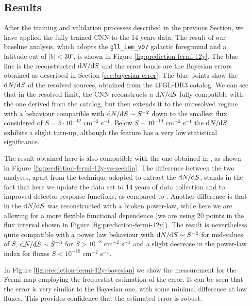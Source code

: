 \subsection{Results}
\label{sec:dnds:results}

After the training and validation processes described in the previous Section, we have applied the fully trained CNN to the 14 years \fermi data. The result of our baseline analysis, which adopts the \verb|gll_iem_v07| galactic foreground and a latitude cut of $|b|<30^\circ$, is shown in Figure \ref{fig:prediction-fermi-12y}. The blue line is the reconstructed $\text{d}N/\text{d}S$ and the error bands are the Bayesian errors obtained as described in Section \ref{sec:bayesian-error}. The blue points show the $\text{d}N/\text{d}S$ of the resolved sources, obtained from the 4FGL-DR3 catalog. We can see that in the resolved limit, the CNN reconstructs a $\text{d}N/\text{d}S$ fully compatible with the one derived from the catalog, but then extends it to the unresolved regime with a behaviour compatible with $\text{d}N/\text{d}S \sim S^{-2}$ down to the smallest flux considered of $S = 5 \cdot 10^{-12}$ cm$^{-2}$ s$^{-1}$.
Below $S \sim  10^{-10}$ cm$^{-2}$ s$^{-1}$ the $\text{d}N/\text{d}S$ exhibits a slight turn-up, although the feature has a very low statistical significance.

The result obtained here is also compatible with the one obtained in \cite{Cuoco-1pdf}, as shown in Figure \ref{fig:prediction-fermi-12y-vs-zechlin}. The difference between the two analyses, apart from the technique adopted to extract the $\text{d}N/\text{d}S$, stands in the fact that here we update the data set to 14 years of \fermi data collection and to improved detector response functions, as compared to \cite{Cuoco-1pdf}. Another difference is that in \cite{Cuoco-1pdf} the  $\text{d}N/\text{d}S$ was reconstructed with a broken power-law, while here we are allowing for a more flexible functional dependence (we are using 20 points in the flux interval shown in Figure \ref{fig:prediction-fermi-12y}). The result is nevertheless quite compatible with a power law behaviour with $\text{d}N/\text{d}S \sim S^{-2}$ for mid-values of $S$, $\text{d}N/\text{d}S \sim S^{-3}$ for $S > 10^{-8}$ cm$^{-2}$ s$^{-1}$ and a slight decrease in the power-law index for fluxes $S < 10^{-10}$ cm$^{-2}$ s$^{-1}$. 


In Figure \ref{fig:prediction-fermi-12y-bayesian} we show the measurement for the Fermi map employing the frequestist estimation of the error. It can be seen that the error is very similar to the Bayesian one, with some minimal difference at low fluxes. This provides confidence that the estimated error is robust. 






